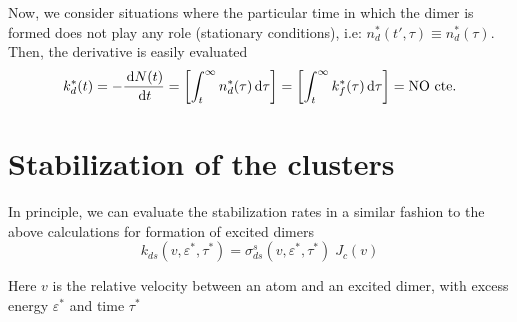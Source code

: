 Now, we consider situations where the particular time in which the dimer is formed does not play any role (stationary conditions), i.e: $n_{d}^{*}(t',\tau) \equiv n_{d}^{*}(\tau)$. Then, the derivative is easily evaluated
\begin{equation}
  \label{Q:rates-number-excit-dimers-simpler}
  k_{d}^{*}(t)= -\frac{\,\mathrm{d} N(t)}{\,\mathrm{d} t} =  \left[\int_{t}^{\infty} n_{d}^{*}(\tau) \,\mathrm{d} \tau \right] =  \left[\int_{t}^{\infty} k_{f}^{*}(\tau) \,\mathrm{d} \tau \right] = \text{NO cte.}
\end{equation}


\section{Stabilization of the clusters}
\label{S:stabil-cluster}

In principle, we can evaluate the stabilization rates in a similar fashion to the above calculations for formation of excited dimers
\begin{equation}
  \label{Q:rates-def-stabil-rate}
    k_{ds}(v , \varepsilon^{*}, \tau^{*}) = \sigma_{ds}^{s}(v, \varepsilon^{*}, \tau^{*}) \; J_{c}(v)
\end{equation}

Here $v$ is the relative velocity between an atom and an excited dimer, with excess energy $\varepsilon^{*}$ and time $\tau^{*}$


